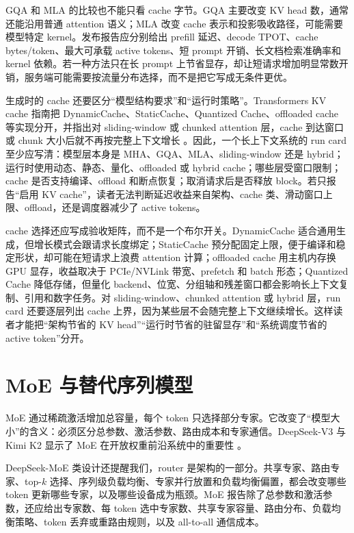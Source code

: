 \documentclass[UTF8,zihao=-4,openany]{ctexbook}
\begin{document}
GQA 和 MLA 的比较也不能只看 cache 字节。GQA 主要改变 KV head 数，通常还能沿用普通 attention 语义；MLA 改变 cache 表示和投影吸收路径，可能需要模型特定 kernel。发布报告应分别给出 prefill 延迟、decode TPOT、cache bytes/token、最大可承载 active tokens、短 prompt 开销、长文档检索准确率和 kernel 依赖。若一种方法只在长 prompt 上节省显存，却让短请求增加明显常数开销，服务端可能需要按流量分布选择，而不是把它写成无条件更优。

生成时的 cache 还要区分“模型结构要求”和“运行时策略”。Transformers KV cache 指南把 DynamicCache、StaticCache、Quantized Cache、offloaded cache 等实现分开，并指出对 sliding-window 或 chunked attention 层，cache 到达窗口或 chunk 大小后就不再按完整上下文增长 \cite{huggingface2026transformerskvcache}。因此，一个长上下文系统的 run card 至少应写清：模型层本身是 MHA、GQA、MLA、sliding-window 还是 hybrid；运行时使用动态、静态、量化、offloaded 或 hybrid cache；哪些层受窗口限制；cache 是否支持编译、offload 和断点恢复；取消请求后是否释放 block。若只报告“启用 KV cache”，读者无法判断延迟收益来自架构、cache 类、滑动窗口上限、offload，还是调度器减少了 active tokens。

cache 选择还应写成验收矩阵，而不是一个布尔开关。DynamicCache 适合通用生成，但增长模式会跟请求长度绑定；StaticCache 预分配固定上限，便于编译和稳定形状，却可能在短请求上浪费 attention 计算；offloaded cache 用主机内存换 GPU 显存，收益取决于 PCIe/NVLink 带宽、prefetch 和 batch 形态；Quantized Cache 降低存储，但量化 backend、位宽、分组轴和残差窗口都会影响长上下文复制、引用和数字任务。对 sliding-window、chunked attention 或 hybrid 层，run card 还要逐层列出 cache 上界，因为某些层不会随完整上下文继续增长。这样读者才能把“架构节省的 KV head”“运行时节省的驻留显存”和“系统调度节省的 active token”分开。

\section{MoE 与替代序列模型}
MoE 通过稀疏激活增加总容量，每个 token 只选择部分专家。它改变了“模型大小”的含义：必须区分总参数、激活参数、路由成本和专家通信。DeepSeek-V3 与 Kimi K2 显示了 MoE 在开放权重前沿系统中的重要性 \cite{deepseek2024v3,kimi2025k2}。

DeepSeek-MoE 类设计还提醒我们，router 是架构的一部分。共享专家、路由专家、top-$k$ 选择、序列级负载均衡、专家并行放置和负载均衡偏置，都会改变哪些 token 更新哪些专家，以及哪些设备成为瓶颈。MoE 报告除了总参数和激活参数，还应给出专家数、每 token 选中专家数、共享专家容量、路由分布、负载均衡策略、token 丢弃或重路由规则，以及 all-to-all 通信成本。
\end{document}
